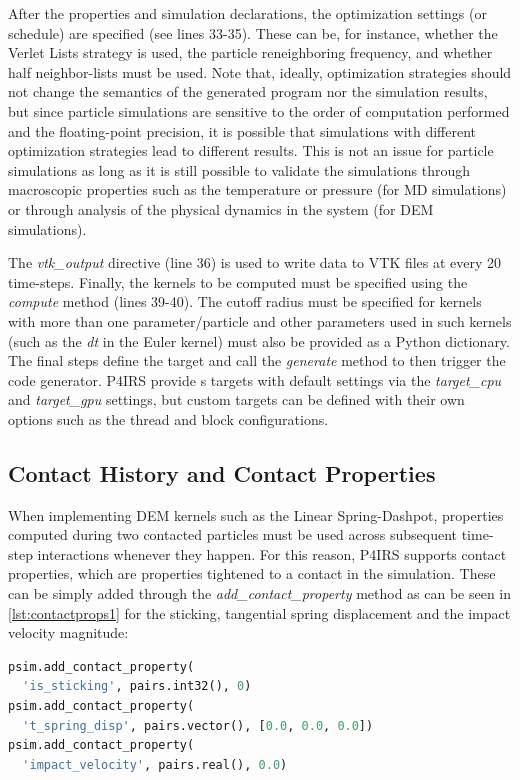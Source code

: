 \documentclass[Afour,sageh,times]{sagej}
\newcommand{\RMchange}[1]{{\color{blue} #1}}
\begin{document}
After the properties and simulation declarations, the optimization settings (or schedule) are specified (see lines 33-35).
These can be, for instance, whether the Verlet Lists strategy is used, the particle reneighboring frequency, and whether half neighbor-lists must be used.
Note that, ideally, optimization strategies should not change the semantics of the generated program nor the simulation results, but since particle simulations are sensitive to the order of computation performed and the floating-point precision, it is possible that simulations with different optimization strategies lead to different results.
This is not an issue for particle simulations as long as it is still possible to validate the simulations through macroscopic properties such as the temperature or pressure (for \ac{MD} simulations) or through analysis of the physical dynamics in the system (for \ac{DEM} simulations).

The \emph{vtk\_output} directive (line 36) is used to write data to VTK files at every 20 time-steps.
Finally, the kernels to be computed must be specified using the \emph{compute} method (lines 39-40).
The cutoff radius must be specified for kernels with more than one parameter/particle and other parameters used in such kernels (such as the \emph{dt} in the Euler kernel) must also be provided as a Python dictionary.
The final steps define the target and call the \emph{generate} method to then trigger the code generator.
P4IRS provide\RMchange{s} targets with default settings via the \emph{target\_cpu} and \emph{target\_gpu} settings, but custom targets can be defined with their own options such as the thread and block configurations.

\subsection{Contact History and Contact Properties}
\label{sec:contact_history}

When implementing DEM kernels such as the Linear Spring-Dashpot, properties computed during two contacted particles must be used across subsequent time-step interactions whenever they happen.
For this reason, P4IRS supports contact properties, which are properties tightened to a contact in the simulation.
These can be simply added through the \emph{add\_contact\_property} method as can be seen in \autoref{lst:contactprops1} for the sticking, tangential spring displacement and the impact velocity magnitude:

\begin{lstlisting}[language=Python,
		   label={lst:contactprops1},
		   caption={Contact properties setup example.}]
psim.add_contact_property(
  'is_sticking', pairs.int32(), 0)
psim.add_contact_property(
  't_spring_disp', pairs.vector(), [0.0, 0.0, 0.0])
psim.add_contact_property(
  'impact_velocity', pairs.real(), 0.0)
\end{lstlisting}
\end{document}
